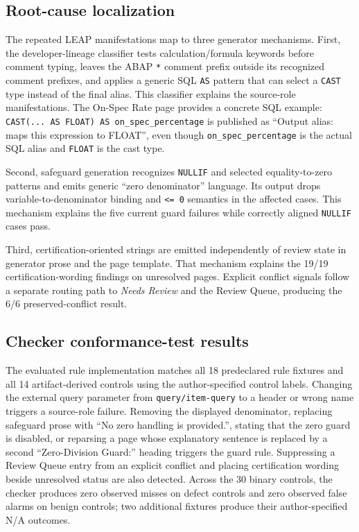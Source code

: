 \documentclass[a4paper,fleqn]{cas-dc}
\begin{document}
\subsection{Root-cause localization}
The repeated LEAP manifestations map to three generator mechanisms. First, the developer-lineage classifier tests calculation/formula keywords before comment typing, leaves the ABAP \texttt{*} comment prefix outside its recognized comment prefixes, and applies a generic SQL \texttt{AS} pattern that can select a \texttt{CAST} type instead of the final alias. This classifier explains the source-role manifestations. The On-Spec Rate page provides a concrete SQL example: \texttt{CAST(... AS FLOAT) AS on\_spec\_percentage} is published as ``Output alias: maps this expression to FLOAT'', even though \texttt{on\_spec\_percentage} is the actual SQL alias and \texttt{FLOAT} is the cast type.

Second, safeguard generation recognizes \texttt{NULLIF} and selected equality-to-zero patterns and emits generic ``zero denominator'' language. Its output drops variable-to-denominator binding and \texttt{<= 0} semantics in the affected cases. This mechanism explains the five current guard failures while correctly aligned \texttt{NULLIF} cases pass.

Third, certification-oriented strings are emitted independently of review state in generator prose and the page template. That mechanism explains the 19/19 certification-wording findings on unresolved pages. Explicit conflict signals follow a separate routing path to \emph{Needs Review} and the Review Queue, producing the 6/6 preserved-conflict result.

\subsection{Checker conformance-test results}
The evaluated rule implementation matches all 18 predeclared rule fixtures and all 14 artifact-derived controls using the author-specified control labels. Changing the external query parameter from \texttt{query/item-query} to a header or wrong name triggers a source-role failure. Removing the displayed denominator, replacing safeguard prose with ``No zero handling is provided.'', stating that the zero guard is disabled, or reparsing a page whose explanatory sentence is replaced by a second ``Zero-Division Guard:'' heading triggers the guard rule. Suppressing a Review Queue entry from an explicit conflict and placing certification wording beside unresolved status are also detected. Across the 30 binary controls, the checker produces zero observed misses on defect controls and zero observed false alarms on benign controls; two additional fixtures produce their author-specified N/A outcomes.
\end{document}
